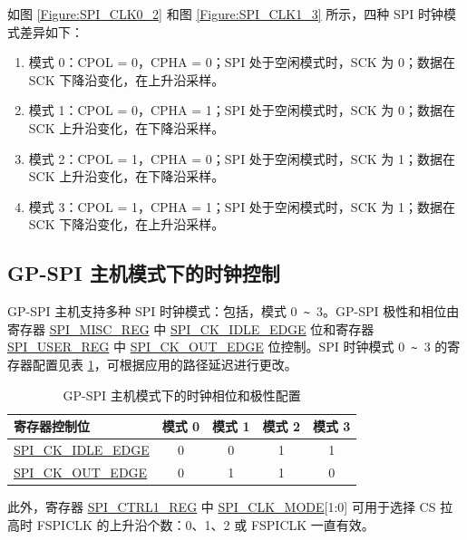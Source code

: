 \documentclass[main\_\_CN.tex]{subfiles}
\begin{document}
如图 \ref{Figure:SPI_CLK0_2} 和图 \ref{Figure:SPI_CLK1_3} 所示，四种 SPI 时钟模式差异如下：
\begin{enumerate}
    \item 模式 0：CPOL = 0，CPHA = 0；SPI 处于空闲模式时，SCK 为 0；数据在 SCK 下降沿变化，在上升沿采样。

    \item 模式 1：CPOL = 0，CPHA = 1；SPI 处于空闲模式时，SCK 为 0；数据在 SCK 上升沿变化，在下降沿采样。

    \item 模式 2：CPOL = 1，CPHA = 0；SPI 处于空闲模式时，SCK 为 1；数据在 SCK 上升沿变化，在下降沿采样。

    \item 模式 3：CPOL = 1，CPHA = 1；SPI 处于空闲模式时，SCK 为 1；数据在 SCK 下降沿变化，在上升沿采样。
\end{enumerate}

\subsection{GP-SPI 主机模式下的时钟控制}\label{GP-SPI2 master clock mode}

GP-SPI 主机支持多种 SPI 时钟模式：包括，模式 0\verb+ ~ +3。GP-SPI 极性和相位由寄存器 \hyperref[regdesc:SPIMISCREG]{SPI\_MISC\_REG} 中 \hyperref[fielddesc:SPICKIDLEEDGE]{SPI\_CK\_IDLE\_EDGE} 位和寄存器 \hyperref[regdesc:SPIUSERREG]{SPI\_USER\_REG} 中 \hyperref[fielddesc:SPICKOUTEDGE]{SPI\_CK\_OUT\_EDGE} 位控制。SPI 时钟模式 0\verb+ ~ +3 的寄存器配置见表 \ref{table:clock_pol_master}，可根据应用的路径延迟进行更改。

\begin{table}[H]
    \centering
    \caption{GP-SPI 主机模式下的时钟相位和极性配置}
    \label{table:clock_pol_master}
    \begin{tabular}[c]{|p{3.5cm}|c|c|c|c|}
    \hline
    \rowcolor{lightgray}
    寄存器控制位  & 模式 0 & 模式 1 & 模式 2 & 模式 3\\
    \hline
    \hyperref[fielddesc:SPICKIDLEEDGE]{SPI\_CK\_IDLE\_EDGE}  & 0     & 0     & 1     & 1\\
    \hline
    \hyperref[fielddesc:SPICKOUTEDGE]{SPI\_CK\_OUT\_EDGE}   & 0     & 1     & 1     & 0\\
    \hline
    \end{tabular}
\end{table}

此外，寄存器 \hyperref[regdesc:SPICTRL1REG]{SPI\_CTRL1\_REG} 中 \hyperref[fielddesc:SPICLKMODE]{SPI\_CLK\_MODE}[1:0] 可用于选择 CS 拉高时 FSPICLK 的上升沿个数：0、1、2 或 FSPICLK 一直有效。
\end{document}
